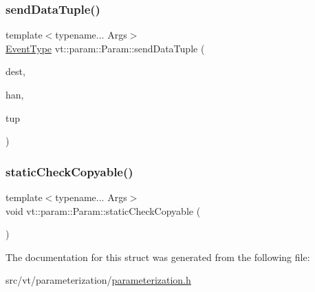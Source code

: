 \subsubsection{\texorpdfstring{send\+Data\+Tuple()}{sendDataTuple()}}
{\footnotesize\ttfamily template$<$typename... Args$>$ \\
\hyperlink{namespacevt_a009267401def7ae8bf201892222d060f}{Event\+Type} vt\+::param\+::\+Param\+::send\+Data\+Tuple (\begin{DoxyParamCaption}\item[{\hyperlink{namespacevt_a866da9d0efc19c0a1ce79e9e492f47e2}{Node\+Type} const \&}]{dest,  }\item[{\hyperlink{namespacevt_af64846b57dfcaf104da3ef6967917573}{Handler\+Type} const \&}]{han,  }\item[{std\+::tuple$<$ Args... $>$ \&\&}]{tup }\end{DoxyParamCaption})\hspace{0.3cm}{\ttfamily [inline]}}

\mbox{\label{structvt_1_1param_1_1_param_a8d670f74eb5f0a1b5ea312e8b174b648}} 
\subsubsection{\texorpdfstring{static\+Check\+Copyable()}{staticCheckCopyable()}}
{\footnotesize\ttfamily template$<$typename... Args$>$ \\
void vt\+::param\+::\+Param\+::static\+Check\+Copyable (\begin{DoxyParamCaption}{ }\end{DoxyParamCaption})\hspace{0.3cm}{\ttfamily [inline]}}



The documentation for this struct was generated from the following file\+:\begin{DoxyCompactItemize}
\item 
src/vt/parameterization/\hyperlink{parameterization_8h}{parameterization.\+h}\end{DoxyCompactItemize}
